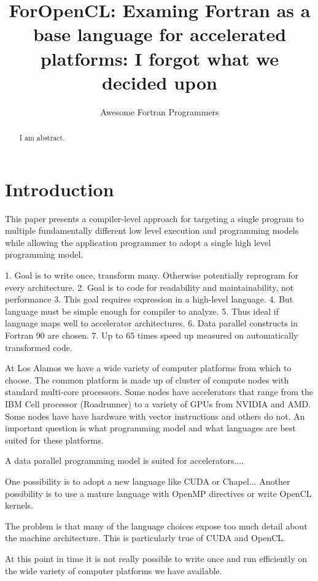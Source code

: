 \documentclass[10pt, conference, compsocconf]{IEEEtran}
\title{ForOpenCL: Examing Fortran as a base language for accelerated platforms:
I forgot what we decided upon}
\author{Awesome Fortran Programmers}
\begin{document}
\maketitle

\begin{abstract}
I am abstract.
\end{abstract}



\section{Introduction}

This paper presents a compiler-level approach for targeting a single program to multiple fundamentally different low level execution and programming models while allowing the application programmer to adopt a single high level programming model.

1. Goal is to write once, transform many. Otherwise potentially reprogram for every architecture.
2. Goal is to code for readability and maintainability, not performance
3. This goal requires expression in a high-level language.
4. But language must be simple enough for compiler to analyze.
5. Thus ideal if language maps well to accelerator architectures.
6. Data parallel constructs in Fortran 90 are chosen.
7. Up to 65 times speed up measured on automatically transformed code.

At Los Alamos we have a wide variety of computer platforms from which
to choose.  The common platform is made up of cluster of compute nodes
with standard multi-core processors.  Some nodes have accelerators
that range from the IBM Cell processor (Roadrunner) to a variety of
GPUs from NVIDIA and AMD.  Some nodes have have hardware with vector
instructions and others do not.  An important question is what programming
model and what languages are best suited for these platforms.

A data parallel programming model is suited for accelerators....

One possibility is to adopt a new language like CUDA or Chapel...
Another possibility is to use a mature language with OpenMP directives
or write OpenCL kernels.

The problem is that many of the language choices expose too much detail
about the machine architecture.  This is particularly true of CUDA and OpenCL.

At this point in time it is not really possible to write once and
run efficiently on the wide variety of computer platforms we have
available.
\end{document}
